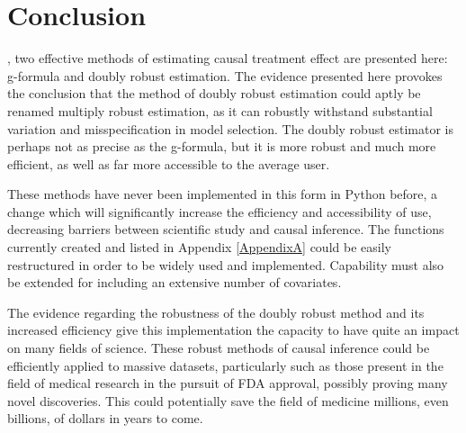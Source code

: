 \chapter{Conclusion}
\label{conclusion}

, two effective methods of estimating causal treatment effect are presented here: g-formula and doubly robust estimation.  The evidence presented here provokes the conclusion that the method of doubly robust estimation could aptly be renamed multiply robust estimation, as it can robustly withstand substantial variation and misspecification in model selection.  The doubly robust estimator is perhaps not as precise as the g-formula, but it is more robust and much more efficient, as well as far more accessible to the average user. 

These methods have never been implemented in this form in Python before, a change which will significantly increase the efficiency and accessibility of use, decreasing barriers between scientific study and causal inference.  The functions currently created and listed in Appendix \ref{AppendixA} could be easily restructured in order to be widely used and implemented.  Capability must also be extended for including an extensive number of covariates.  

The evidence regarding the robustness of the doubly robust method and its increased efficiency give this implementation the capacity to have quite an impact on many fields of science.  These robust methods of causal inference could be efficiently applied to massive datasets, particularly such as those present in the field of medical research in the pursuit of FDA approval, possibly proving many novel discoveries.  This could potentially save the field of medicine millions, even billions, of dollars in years to come.  


